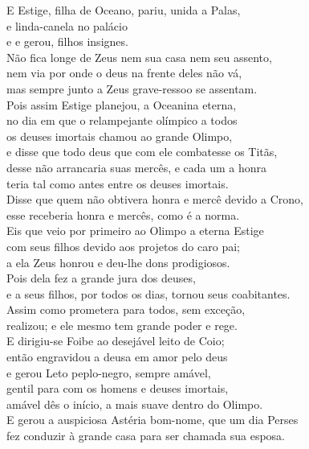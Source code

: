 \begin{pages}
\begin{Rightside}
\quad{}E Estige, filha de Oceano, pariu, unida a Palas,\\
 e  linda-canela no palácio\\
e  e  gerou, filhos insignes. \\
Não fica longe de Zeus nem sua casa nem seu assento,\\
nem via por onde o deus na frente deles não vá,\\
mas sempre junto a Zeus grave-ressoo se assentam.\\
Pois assim Estige planejou, a Oceanina eterna,\\
no dia em que o relampejante olímpico a todos \\
os deuses imortais chamou ao grande Olimpo,\\
e disse que todo deus que com ele combatesse os Titãs,\\
desse não arrancaria suas mercês, e cada um a honra\\
teria tal como antes entre os deuses imortais.\\
Disse que quem não obtivera honra e mercê devido a Crono, \\
esse receberia honra e mercês, como é a norma.\\
Eis que veio por primeiro ao Olimpo a eterna Estige\\
com seus filhos devido aos projetos do caro pai;\\
a ela Zeus honrou e deu-lhe dons prodigiosos.\\
Pois dela fez a grande jura dos deuses, \\
e a seus filhos, por todos os dias, tornou seus coabitantes.\\
Assim como prometera para todos, sem exceção,\\
realizou; e ele mesmo tem grande poder e rege.\\

\quad{}E dirigiu-se Foibe ao desejável leito de Coio;\\
então engravidou a deusa em amor pelo deus \\
e gerou Leto peplo-negro, sempre amável,\\
gentil para com os homens e deuses imortais,\\
amável dês o início, a mais suave dentro do Olimpo.\\
E gerou a auspiciosa Astéria bom-nome, que um dia Perses\\
fez conduzir à grande casa para ser chamada sua esposa. \\


\end{Rightside}
\end{pages}
